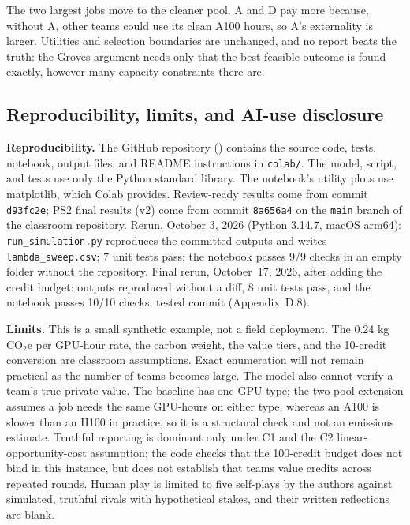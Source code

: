 The two largest jobs move to the cleaner pool. A and D pay more because, without A, other teams could use its clean A100 hours, so A's externality is larger. Utilities and selection boundaries are unchanged, and no report beats the truth: the Groves argument needs only that the best feasible outcome is found exactly, however many capacity constraints there are.

\subsection{Reproducibility, limits, and AI-use disclosure}

\textbf{Reproducibility.} The GitHub repository (\GitHubLink) contains the source code, tests, notebook, output files, and README instructions in \texttt{colab/}. The model, script, and tests use only the Python standard library. The notebook's utility plots use matplotlib, which Colab provides. Review-ready results come from commit \texttt{d93fc2e}; PS2 final results (v2) come from commit \texttt{8a656a4} on the \texttt{main} branch of the classroom repository. Rerun, October 3, 2026 (Python 3.14.7, macOS arm64): \texttt{run\_simulation.py} reproduces the committed outputs and writes \texttt{lambda\_sweep.csv}; 7 unit tests pass; the notebook passes 9/9 checks in an empty folder without the repository. Final rerun, October~17, 2026, after adding the credit budget: outputs reproduced without a diff, 8 unit tests pass, and the notebook passes 10/10 checks; tested commit \texttt{\TestedCommit} (Appendix~D.8).

\textbf{Limits.} This is a small synthetic example, not a field deployment. The 0.24 kg CO$_2$e per GPU-hour rate, the carbon weight, the value tiers, and the 10-credit conversion are classroom assumptions. Exact enumeration will not remain practical as the number of teams becomes large. The model also cannot verify a team's true private value. The baseline has one GPU type; the two-pool extension assumes a job needs the same GPU-hours on either type, whereas an A100 is slower than an H100 in practice, so it is a structural check and not an emissions estimate. Truthful reporting is dominant only under C1 and the C2 linear-opportunity-cost assumption; the code checks that the 100-credit budget does not bind in this instance, but does not establish that teams value credits across repeated rounds. Human play is limited to five self-plays by the authors against simulated, truthful rivals with hypothetical stakes, and their written reflections are blank.


